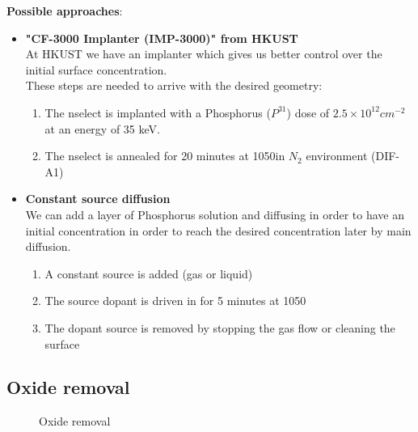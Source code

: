 \textbf{Possible approaches}:
\begin{itemize}
	\item \textbf{"CF-3000 Implanter (IMP-3000)" from HKUST} \\
	At HKUST we have an implanter which gives us better control over the initial surface concentration. \\
	These steps are needed to arrive with the desired geometry:
	\begin{enumerate}
		\item The nselect is implanted with a Phosphorus ($P^{31}$) dose of $2.5\times10^{12}cm^{-2}$ at an energy of 35 keV.
		\item The nselect is annealed for 20 minutes at 1050\degreesC in $N_2$ environment (DIF-A1)
	\end{enumerate}
	\item \textbf{Constant source diffusion} \\
	We can add a layer of Phosphorus solution and diffusing in order to have an initial concentration in order to reach the desired concentration later by main diffusion.
		\begin{enumerate}
		\item A constant source is added (gas or liquid)
		\item The source dopant is driven in for 5 minutes at 1050\degreesC
		\item The dopant source is removed by stopping the gas flow or cleaning the surface
	\end{enumerate}
\end{itemize}

\subsection{Oxide removal}
\begin{figure}[H]
	\centering
	\begin{tikzpicture}[node distance = 3cm, auto, thick,scale=\CrossSectionOnly, every node/.style={transform shape}]
		
	\end{tikzpicture}
	\drawStepArrow{}
	\begin{tikzpicture}[node distance = 3cm, auto, thick,scale=\CrossSectionOnly, every node/.style={transform shape}]
		
	\end{tikzpicture}
	\caption{Oxide removal}
\end{figure}
